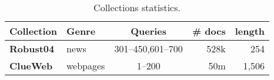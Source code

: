 \begin{table}
\centering
\caption{Collections statistics.}
\begin{tabularx}{\linewidth}{Xlcrr} 
\toprule
\bf Collection & \bf Genre & \bf Queries & \bf \# docs & \bf length  \\ %
\midrule
\bf Robust04 & news  & 301--450,601--700 & 528k & 254  \\ %
\bf ClueWeb & webpages & 1--200 & 50m & 1,506  \\ 
\bottomrule
\end{tabularx}
\label{tab:data}
\end{table}